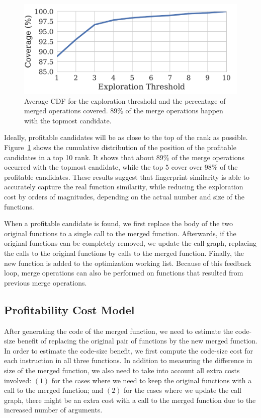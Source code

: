 \begin{figure}[t!]
  \centering
  \includegraphics[width=0.8\linewidth]{figs/average-cdf-exploration-threshold.pdf}
  \caption{Average CDF for the exploration threshold and the percentage of merged operations covered.
           89\% of the merge operations happen with the topmost candidate.}
  \label{fig:average-cdf-exploration-threshold}
\end{figure}

Ideally, profitable candidates will be as close to the top of the rank as
possible.
Figure~\ref{fig:average-cdf-exploration-threshold} shows the cumulative
distribution of the position of the profitable candidates in a top 10 rank.
It shows that about 89\% of the merge operations occurred with the topmost
candidate, while the top 5 cover over 98\% of the profitable candidates.
These results suggest that fingerprint similarity is able to
accurately capture the real function similarity, while reducing the exploration
cost by orders of magnitudes, depending on the actual number and size of
the functions.

When a profitable candidate is found, we first replace the body of the two
original functions to a single call to the merged function.
Afterwards, if the original functions can be completely removed, we update the
call graph, replacing the calls to the original functions by calls to the
merged function.
Finally, the new function is added to the optimization working list.
Because of this feedback loop, merge operations can also be performed on
functions that resulted from previous merge operations.

\subsection{Profitability Cost Model}\label{sec:profit-model}

After generating the code of the merged function, we need to estimate the
code-size benefit of replacing the original pair of functions by the new merged
function.
In order to estimate the code-size benefit, we first compute the code-size cost
for each instruction in all three functions.
In addition to measuring the difference in size of the merged function, we also
need to take into account all extra costs involved:
$(1)$ for the cases where we need to keep the original functions with a call to
the merged function;
and $(2)$ for the cases where we update the call graph, there might be an extra
cost with a call to the merged function due to the increased number of arguments.

